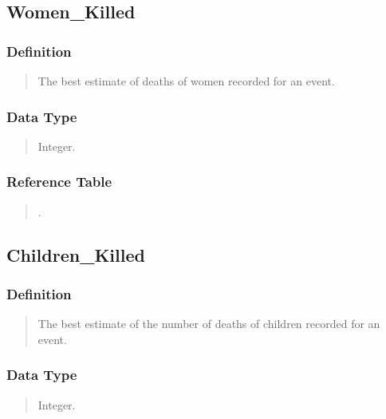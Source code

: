 \documentclass[letterpaper,10pt,english]{sphinxmanual}
\begin{document}
\subsection{Women\_Killed}
\label{\detokenize{schema_tables:women-killed}}

\subsubsection{Definition}
\label{\detokenize{schema_tables:id46}}\begin{quote}

\sphinxAtStartPar
The best estimate of deaths of women recorded for an event.
\end{quote}


\subsubsection{Data Type}
\label{\detokenize{schema_tables:id47}}\begin{quote}

\sphinxAtStartPar
Integer.
\end{quote}


\subsubsection{Reference Table}
\label{\detokenize{schema_tables:id48}}\begin{quote}

\sphinxAtStartPar
{\hyperref[\detokenize{schema_tables:overview-table}]{}}.
\end{quote}


\subsection{Children\_Killed}
\label{\detokenize{schema_tables:children-killed}}

\subsubsection{Definition}
\label{\detokenize{schema_tables:id49}}\begin{quote}

\sphinxAtStartPar
The best estimate of the number of deaths of children recorded for an event.
\end{quote}


\subsubsection{Data Type}
\label{\detokenize{schema_tables:id50}}\begin{quote}

\sphinxAtStartPar
Integer.
\end{quote}
\end{document}
